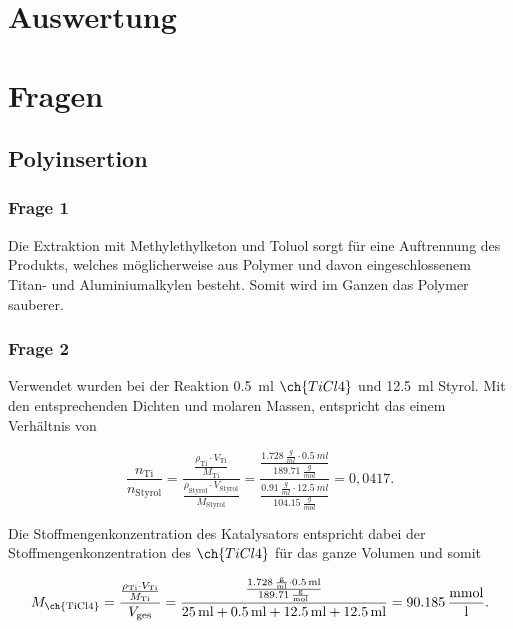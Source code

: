 \documentclass[10pt,a4paper,ngerman]{scrartcl}
\begin{document}
\section{Auswertung}

	

\section{Fragen}

	\subsection{Polyinsertion}

		\subsubsection{Frage 1}

			Die Extraktion mit Methylethylketon und Toluol sorgt für eine Auftrennung des Produkts, welches möglicherweise aus Polymer und davon eingeschlossenem Titan- 
			und Aluminiumalkylen besteht. Somit wird im Ganzen das Polymer sauberer.

		\subsubsection{Frage 2}

			Verwendet wurden bei der Reaktion \SI{0,5}{ml} $\ch{TiCl4}$ und \SI{12,5}{ml} Styrol. Mit den entsprechenden Dichten und molaren Massen, entspricht das einem 
			Verhältnis von 

			\begin{equation}
				\frac{n_\text{Ti}}{n_\text{Styrol}} = \frac{\frac{\rho_\text{Ti} \cdot V_\text{Ti}}{M_\text{Ti}}}{\frac{\rho_\text{Styrol} \cdot V_\text{Styrol}}{M_\text{Styrol}}} = \frac{\frac{\SI{1,728}{\frac{g}{ml}} \cdot \SI{0,5}{ml}}{\SI{189,71}{\frac{g}{mol}}}}{\frac{{\SI{0,91}{\frac{g}{ml}} \cdot \SI{12,5}{ml}}}{\SI{104,15}{\frac{g}{mol}}}} = 0,0417 \text{.}
			\end{equation}

			Die Stoffmengenkonzentration des Katalysators entspricht dabei der Stoffmengenkonzentration des $\ch{TiCl4}$ für das ganze Volumen und somit

			\begin{equation*}
				M_\text{\ch{TiCl4}} = \frac{\frac{\rho_\text{Ti} \cdot V_\text{Ti}}{M_\text{Ti}}}{V_\text{ges}} = \frac{\frac{\SI{1,728}{\frac{g}{ml}} \cdot \SI{0,5}{ml}}{\SI{189,71}{\frac{g}{mol}}}}{\SI{25}{ml} + \SI{0,5}{ml} + \SI{12,5}{ml} + \SI{12,5}{ml}} = \SI{90,185}{\frac{mmol}{l}} \text{.}
			\end{equation*}
\end{document}
